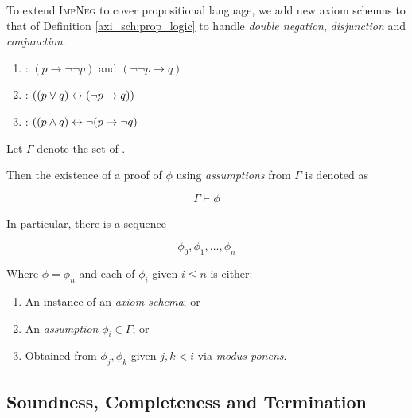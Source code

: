 \begin{definition}\label{axi_sch:prop_logic}
    To extend \textsc{ImpNeg} to cover propositional language, we add new axiom schemas
    to that of Definition \ref{axi_sch:prop_logic} to handle \textit{double negation}, 
    \textit{disjunction} and \textit{conjunction}.
    
    \begin{enumerate}
        \item {}: $(p \to \neg \neg p)$ and $(\neg \neg p \to q)$
        \item {}: $((p \lor q) \leftrightarrow (\neg p \to q))$
        \item {}: $((p \land q) \leftrightarrow \neg(p \to \neg q)$
    \end{enumerate}
\end{definition}

\begin{definition}
    Let $\Gamma$ denote the set of .
    
    Then the existence of a proof of $\phi$ using \textit{assumptions} from $\Gamma$
    is denoted as
    
    \begin{equation}
        \Gamma \vdash \phi
    \end{equation}
    
    In particular, there is a sequence
    
    \begin{equation}
        \phi_0, \phi_1, \ldots, \phi_n    
    \end{equation}
    
    Where $\phi = \phi_n$ and each of $\phi_i$ given $i \le n$ is either:
    
    \begin{enumerate}
        \item An instance of an \textit{axiom schema}; or
        \item An \textit{assumption} $\phi_i \in \Gamma$; or
        \item Obtained from $\phi_j, \phi_k$ given $j, k < i$ via \textit{modus ponens}.
    \end{enumerate}
\end{definition}

\subsection{Soundness, Completeness and Termination}

